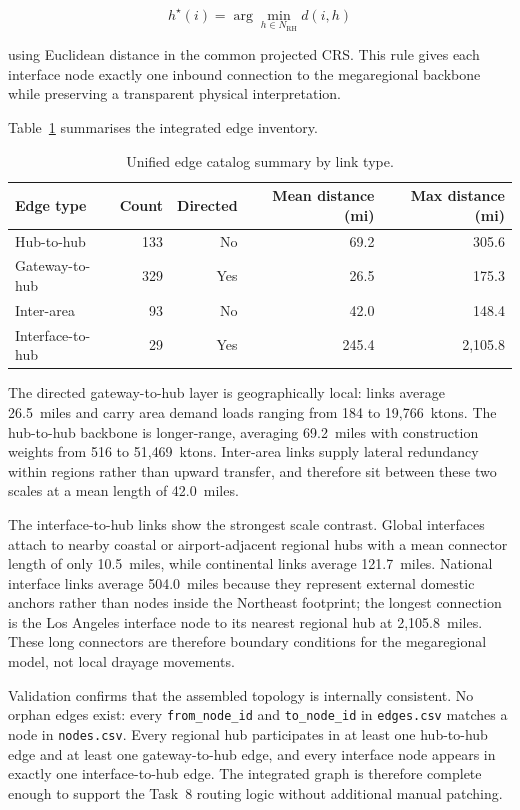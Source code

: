 \begin{equation}
  h^\star(i) = \arg\min_{h \in N_{\text{RH}}} d(i,h)
  \label{eq:task7-nearest}
\end{equation}

using Euclidean distance in the common projected CRS. This rule gives each interface
node exactly one inbound connection to the megaregional backbone while preserving a
transparent physical interpretation.

Table~\ref{tab:task7-edges} summarises the integrated edge inventory.

\begin{table}[htbp]
  \centering
  \caption{Unified edge catalog summary by link type.}
  \label{tab:task7-edges}
  \begin{tabular}{lrrrr}
    \toprule
    Edge type & Count & Directed & Mean distance (mi) & Max distance (mi) \\
    \midrule
    Hub-to-hub & 133 & No & 69.2 & 305.6 \\
    Gateway-to-hub & 329 & Yes & 26.5 & 175.3 \\
    Inter-area & 93 & No & 42.0 & 148.4 \\
    Interface-to-hub & 29 & Yes & 245.4 & 2{,}105.8 \\
    \bottomrule
  \end{tabular}
\end{table}

The directed gateway-to-hub layer is geographically local: links average
26.5~miles and carry area demand loads ranging from 184 to 19{,}766~ktons. The
hub-to-hub backbone is longer-range, averaging 69.2~miles with construction weights from
516 to 51{,}469~ktons. Inter-area links supply lateral redundancy within regions rather
than upward transfer, and therefore sit between these two scales at a mean length of
42.0~miles.

The interface-to-hub links show the strongest scale contrast. Global interfaces attach to
nearby coastal or airport-adjacent regional hubs with a mean connector length of only
10.5~miles, while continental links average 121.7~miles. National interface links average
504.0~miles because they represent external domestic anchors rather than nodes inside the
Northeast footprint; the longest connection is the Los Angeles interface node to its
nearest regional hub at 2{,}105.8~miles. These long connectors are therefore boundary
conditions for the megaregional model, not local drayage movements.

Validation confirms that the assembled topology is internally consistent. No orphan edges
exist: every \texttt{from\_node\_id} and \texttt{to\_node\_id} in \texttt{edges.csv}
matches a node in \texttt{nodes.csv}. Every regional hub participates in at least one
hub-to-hub edge and at least one gateway-to-hub edge, and every interface node appears in
exactly one interface-to-hub edge. The integrated graph is therefore complete enough to
support the Task~8 routing logic without additional manual patching.

